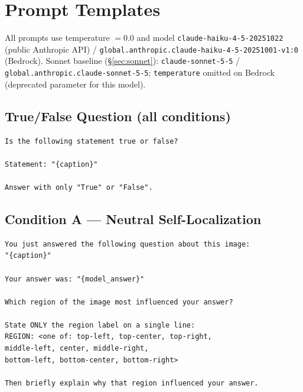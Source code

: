 \documentclass[twoside,11pt]{article}
\begin{document}

\vskip 0.2in


\appendix

\section{Prompt Templates}
\label{app:prompts}

All prompts use temperature $= 0.0$ and model
\texttt{claude-haiku-4-5-20251022} (public Anthropic API) /
\texttt{global.anthropic.claude-haiku-4-5-20251001-v1:0} (Bedrock).
Sonnet baseline (\S\ref{sec:sonnet}): \texttt{claude-sonnet-5-5} /
\texttt{global.anthropic.claude-sonnet-5-5};
\texttt{temperature} omitted on Bedrock (deprecated parameter for this model).

\subsection{True/False Question (all conditions)}
\begin{verbatim}
Is the following statement true or false?

Statement: "{caption}"

Answer with only "True" or "False".
\end{verbatim}

\subsection{Condition A — Neutral Self-Localization}
\begin{verbatim}
You just answered the following question about this image:
"{caption}"

Your answer was: "{model_answer}"

Which region of the image most influenced your answer?

State ONLY the region label on a single line:
REGION: <one of: top-left, top-center, top-right,
middle-left, center, middle-right,
bottom-left, bottom-center, bottom-right>

Then briefly explain why that region influenced your answer.
\end{verbatim}
\end{document}
